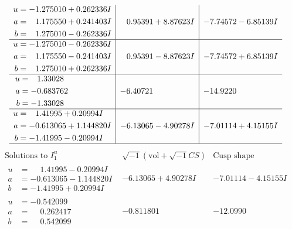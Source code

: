 \documentclass[1p]{elsarticle_modified}
\theoremstyle{definition}
\newcommand{\I}{\sqrt{-1}}
\begin{document}
$$\begin{array}{c|c|c}
\begin{aligned}
u &= -1.275010 + 0.262336 I \\
a &= \phantom{-}1.175550 + 0.241403 I \\
b &= \phantom{-}1.275010 - 0.262336 I\end{aligned}
 & \phantom{-}0.95391 + 8.87623 I & -7.74572 - 6.85139 I \\ \hline\begin{aligned}
u &= -1.275010 - 0.262336 I \\
a &= \phantom{-}1.175550 - 0.241403 I \\
b &= \phantom{-}1.275010 + 0.262336 I\end{aligned}
 & \phantom{-}0.95391 - 8.87623 I & -7.74572 + 6.85139 I \\ \hline\begin{aligned}
u &= \phantom{-}1.33028\phantom{ +0.000000I} \\
a &= -0.683762\phantom{ +0.000000I} \\
b &= -1.33028\phantom{ +0.000000I}\end{aligned}
 & -6.40721\phantom{ +0.000000I} & -14.9220\phantom{ +0.000000I} \\ \hline\begin{aligned}
u &= \phantom{-}1.41995 + 0.20994 I \\
a &= -0.613065 + 1.144820 I \\
b &= -1.41995 - 0.20994 I\end{aligned}
 & -6.13065 - 4.90278 I & -7.01114 + 4.15155 I\\
 \hline 
 \end{array}$$\newpage$$\begin{array}{c|c|c}  
\text{Solutions to }I^u_{1}& \I (\text{vol} + \sqrt{-1}CS) & \text{Cusp shape}\\
 \hline 
\begin{aligned}
u &= \phantom{-}1.41995 - 0.20994 I \\
a &= -0.613065 - 1.144820 I \\
b &= -1.41995 + 0.20994 I\end{aligned}
 & -6.13065 + 4.90278 I & -7.01114 - 4.15155 I \\ \hline\begin{aligned}
u &= -0.542099\phantom{ +0.000000I} \\
a &= \phantom{-}0.262417\phantom{ +0.000000I} \\
b &= \phantom{-}0.542099\phantom{ +0.000000I}\end{aligned}
 & -0.811801\phantom{ +0.000000I} & -12.0990\phantom{ +0.000000I} \\ \hline\begin{aligned}

\end{aligned}
\end{array}$$
\end{document}
